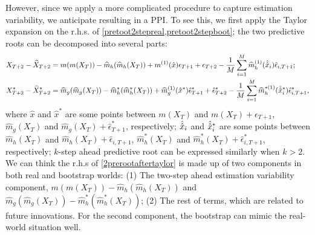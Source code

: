 \documentclass[a4paper]{article}
\begin{document}
However, since we apply a more complicated procedure to capture 
estimation variability, 
we anticipate resulting in a PPI.  To see this, we first apply the Taylor expansion on the r.h.s. of \cref{pretoot2stepreal,pretoot2stepboot}; the two predictive roots can be decomposed into several parts:
\begin{equation}\label{2prerootaftertaylor}
\begin{split}
    &X_{T+2} - \widehat{X}_{T+2}  = m(m(X_T)) - \widehat{m}_{h}(\widehat{m}_{h}(X_T)) + m^{(1)}(\hat{x})\epsilon_{T+1} + \epsilon_{T+2}  - \frac{1}{M}\sum_{i=1}^{M}\widehat{m}^{(1)}_{h}(\Hat{\Hat{x}}_i)\hat{\epsilon}_{i,T+1};\\
    & X^*_{T+2} - \widehat{X}^*_{T+2} = \widehat{m}_{g}(\widehat{m}_{g}(X_T)) - \widehat{m}^*_{h}(\widehat{m}^*_{h}(X_T)) + \widehat{m}_{g}^{(1)}(\hat{x}^*)\hat{\epsilon}^*_{T+1} + \hat{\epsilon}^*_{T+2}  - \frac{1}{M}\sum_{i=1}^{M}\widehat{m}^{*(1)}_{h}(\Hat{\Hat{x}}_i^*)\hat{\epsilon}^*_{i,T+1},
\end{split}
\end{equation}
where $\hat{x}$ and $\hat{x}^*$ are some points between $m(X_T)$ and $m(X_T)+\epsilon_{T+1}$, $\widehat{m}_{g}(X_T)$ and $\widehat{m}_{g}(X_T) + \hat{\epsilon}_{T+1}^*$, respectively; $\Hat{\Hat{x}}_i$ and $\Hat{\Hat{x}}_i^*$ are some points between $\widehat{m}_{h}(X_T)$ and $\widehat{m}_{h}(X_T)+\hat{\epsilon}_{i,T+1}$, $\widehat{m}^*_{h}(X_T)$ and $\widehat{m}^*_{h}(X_T)+\hat{\epsilon}^*_{i,T+1}$, respectively; $k$-step ahead predictive root can be expressed similarly when $k>2$. We can think the r.h.s of \cref{2prerootaftertaylor} is made up of two components in both real and bootstrap worlds: (1) The two-step ahead estimation variability component, $m(m(X_T)) - \widehat{m}_{h}(\widehat{m}_{h}(X_T))$ and $\widehat{m}_{g}(\widehat{m}_{g}(X_T)) -  \widehat{m}^*_{h}(\widehat{m}^*_{h}(X_T))$; (2) The rest of terms, which are related to future innovations. For the second component, the bootstrap can mimic the real-world situation well.
\end{document}
